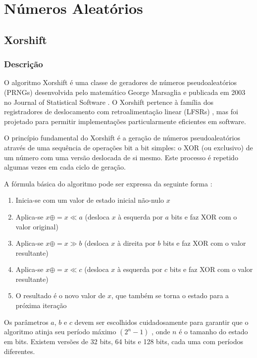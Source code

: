 \chapter{Números Aleatórios}\label{chap:numeros-aleatorios}

\section{Xorshift}

\subsection{Descrição}

O algoritmo Xorshift é uma classe de geradores de números pseudoaleatórios (PRNGs) desenvolvida pelo matemático George Marsaglia e publicada em 2003 no Journal of Statistical Software \cite{marsaglia2003xorshift}. O Xorshift pertence à família dos registradores de deslocamento com retroalimentação linear (LFSRs) \cite{brent2004note}, mas foi projetado para permitir implementações particularmente eficientes em software.

O princípio fundamental do Xorshift é a geração de números pseudoaleatórios através de uma sequência de operações bit a bit simples: o XOR (ou exclusivo) de um número com uma versão deslocada de si mesmo. Este processo é repetido algumas vezes em cada ciclo de geração.

A fórmula básica do algoritmo pode ser expressa da seguinte forma \cite{marsaglia2003xorshift}:
\begin{enumerate}
    \item Inicia-se com um valor de estado inicial não-nulo $x$
    \item Aplica-se $x \oplus= x \ll a$ (desloca $x$ à esquerda por $a$ bits e faz XOR com o valor original)
    \item Aplica-se $x \oplus= x \gg b$ (desloca $x$ à direita por $b$ bits e faz XOR com o valor resultante)
    \item Aplica-se $x \oplus= x \ll c$ (desloca $x$ à esquerda por $c$ bits e faz XOR com o valor resultante)
    \item O resultado é o novo valor de $x$, que também se torna o estado para a próxima iteração
\end{enumerate}

Os parâmetros $a$, $b$ e $c$ devem ser escolhidos cuidadosamente para garantir que o algoritmo atinja seu período máximo $(2^n-1)$ \cite{marsaglia2003xorshift, brent2004note}, onde $n$ é o tamanho do estado em bits. Existem versões de 32 bits, 64 bits e 128 bits, cada uma com períodos diferentes.

